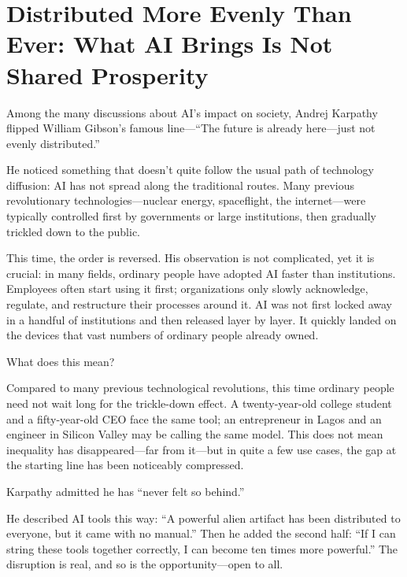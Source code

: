 \section{Distributed More Evenly Than Ever: What AI Brings Is Not Shared Prosperity}

Among the many discussions about AI's impact on society, Andrej Karpathy flipped William Gibson's famous line---``The future is already here---just not evenly distributed.''

He noticed something that doesn't quite follow the usual path of technology diffusion: AI has not spread along the traditional routes. Many previous revolutionary technologies---nuclear energy, spaceflight, the internet---were typically controlled first by governments or large institutions, then gradually trickled down to the public.

\vspace{1em}

This time, the order is reversed. His observation is not complicated, yet it is crucial: in many fields, ordinary people have adopted AI faster than institutions. Employees often start using it first; organizations only slowly acknowledge, regulate, and restructure their processes around it. AI was not first locked away in a handful of institutions and then released layer by layer. It quickly landed on the devices that vast numbers of ordinary people already owned.

What does this mean?

Compared to many previous technological revolutions, this time ordinary people need not wait long for the trickle-down effect. A twenty-year-old college student and a fifty-year-old CEO face the same tool; an entrepreneur in Lagos and an engineer in Silicon Valley may be calling the same model. This does not mean inequality has disappeared---far from it---but in quite a few use cases, the gap at the starting line has been noticeably compressed.

\vspace{1em}

Karpathy admitted he has ``never felt so behind.''

He described AI tools this way: ``A powerful alien artifact has been distributed to everyone, but it came with no manual.'' Then he added the second half: ``If I can string these tools together correctly, I can become ten times more powerful.''
The disruption is real, and so is the opportunity---open to all.

